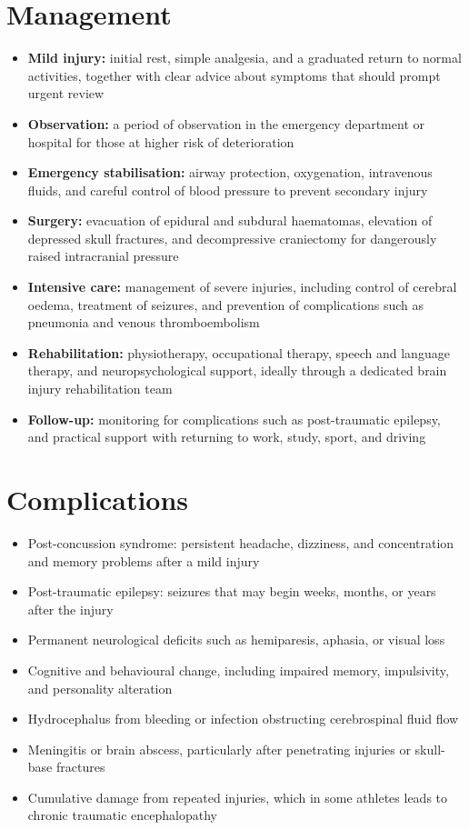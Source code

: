 \section*{Management}
\begin{itemize}
    \item \textbf{Mild injury:} initial rest, simple analgesia, and a graduated return to normal activities, together with clear advice about symptoms that should prompt urgent review
    \item \textbf{Observation:} a period of observation in the emergency department or hospital for those at higher risk of deterioration
    \item \textbf{Emergency stabilisation:} airway protection, oxygenation, intravenous fluids, and careful control of blood pressure to prevent secondary injury
    \item \textbf{Surgery:} evacuation of epidural and subdural haematomas, elevation of depressed skull fractures, and decompressive craniectomy for dangerously raised intracranial pressure
    \item \textbf{Intensive care:} management of severe injuries, including control of cerebral oedema, treatment of seizures, and prevention of complications such as pneumonia and venous thromboembolism
    \item \textbf{Rehabilitation:} physiotherapy, occupational therapy, speech and language therapy, and neuropsychological support, ideally through a dedicated brain injury rehabilitation team
    \item \textbf{Follow-up:} monitoring for complications such as post-traumatic epilepsy, and practical support with returning to work, study, sport, and driving
\end{itemize}

\section*{Complications}
\begin{itemize}
    \item Post-concussion syndrome: persistent headache, dizziness, and concentration and memory problems after a mild injury
    \item Post-traumatic epilepsy: seizures that may begin weeks, months, or years after the injury
    \item Permanent neurological deficits such as hemiparesis, aphasia, or visual loss
    \item Cognitive and behavioural change, including impaired memory, impulsivity, and personality alteration
    \item Hydrocephalus from bleeding or infection obstructing cerebrospinal fluid flow
    \item Meningitis or brain abscess, particularly after penetrating injuries or skull-base fractures
    \item Cumulative damage from repeated injuries, which in some athletes leads to chronic traumatic encephalopathy
\end{itemize}

